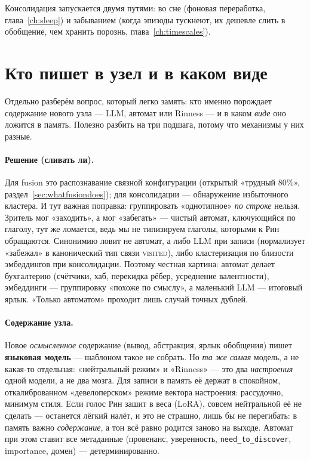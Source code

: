 Консолидация запускается двумя путями: во сне (фоновая переработка,
глава~\ref{ch:sleep}) и забыванием (когда эпизоды тускнеют, их дешевле слить в
обобщение, чем хранить порознь, глава~\ref{ch:timescales}).

\section{Кто пишет в узел и в каком виде}
\label{sec:whowrites}

Отдельно разберём вопрос, который легко замять: кто именно порождает содержание
нового узла — LLM, автомат или Rinness — и в каком \emph{виде} оно ложится в память.
Полезно разбить на три подшага, потому что механизмы у них разные.

\paragraph{Решение (сливать ли).} Для fusion это распознавание связной
конфигурации (открытый «трудный 80\%», раздел~\ref{sec:whatfusiondoes}); для
консолидации — обнаружение избыточного кластера. И тут важная поправка: группировать
«однотипное» \emph{по строке} нельзя. Зритель мог «заходить», а мог «забегать» —
чистый автомат, ключующийся по глаголу, тут же ломается, ведь мы не типизируем
глаголы, которыми к Рин обращаются. Синонимию ловит не автомат, а либо LLM при
записи (нормализует «забежал» в канонический тип связи \textsc{visited}), либо
кластеризация по близости эмбеддингов при консолидации. Поэтому честная картина:
автомат делает бухгалтерию (счётчики, хаб, перекидка рёбер, усреднение валентности),
эмбеддинги — группировку «похоже по смыслу», а маленький LLM — итоговый ярлык.
«Только автоматом» проходит лишь случай точных дублей.

\paragraph{Содержание узла.} Новое \emph{осмысленное} содержание (вывод, абстракция,
ярлык обобщения) пишет \textbf{языковая модель} — шаблоном такое не собрать. Но
\emph{та же самая} модель, а не какая-то отдельная: «нейтральный режим» и «Rinness»
— это два \emph{настроения} одной модели, а не два мозга. Для записи в память её
держат в спокойном, откалиброванном «девелоперском» режиме вектора настроения:
рассудочно, минимум стиля. Если голос Рин зашит в веса (LoRA), совсем нейтральной её
не сделать — останется лёгкий налёт, и это не страшно, лишь бы не перегибать: в
память важно \emph{содержание}, а тон всё равно родится заново на выходе. Автомат
при этом ставит все метаданные (провенанс, уверенность, \texttt{need\_to\_discover},
importance, домен) — детерминированно.

